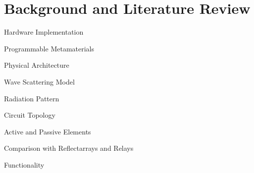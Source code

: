 
\graphicspath{{assets/chapter_2/}}

\chapter{Background and Literature Review}

\begin{section}{}


	\begin{subsection}{Hardware Implementation}
		\begin{subsubsection}{Programmable Metamaterials}

		\end{subsubsection}

		\begin{subsubsection}{Physical Architecture}

		\end{subsubsection}
	\end{subsection}

	\begin{subsection}{Wave Scattering Model}
		\begin{subsubsection}{Radiation Pattern}

		\end{subsubsection}

		\begin{subsubsection}{Circuit Topology}

		\end{subsubsection}

		\begin{subsubsection}{Active and Passive Elements}

		\end{subsubsection}

		\begin{subsubsection}{}

		\end{subsubsection}
	\end{subsection}

	\begin{subsection}{Comparison with Reflectarrays and Relays}
		\begin{subsubsection}{Functionality}

		\end{subsubsection}


\end{subsection}
\end{section}
